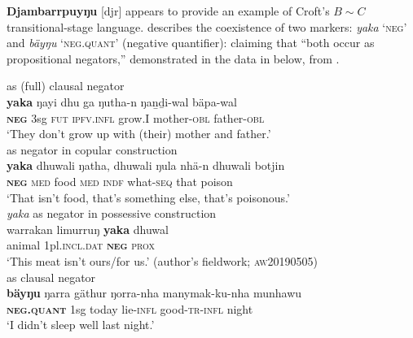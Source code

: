 \documentclass[output=paper,draft,draftmode,colorlinks,citecolor=brown]{langscibook}
\begin{document}
\textbf{Djambarrpuyŋu} [djr] appears to provide an example of Croft's $B\sim C$ transitional-stage language. \citet[356]{Wilkinson1991} describes the coexistence of two markers: \textit{yaka} `\textsc{neg}' and \textit{bäyŋu} `\textsc{neg.quant}' (negative quantifier): claiming that ``both occur as propositional negators,'' demonstrated in the data in  below, from \citet{Wilkinson1991}.

\begin{exe}\ex\label{ex:austr-djamb-negmarkers}
    \begin{xlist}
 as (full) clausal negator\\
\gll \textbf{yaka} ŋayi dhu ga ŋutha-n ŋaṉḏi-wal bäpa-wal\\
\textsc{\textbf{neg}} 3sg \textsc{fut} \textsc{ipfv.infl} grow.I mother\textsc{-obl} father\textsc{-obl}\\
\glt  `They don't grow up with (their) mother and father.'\\
%
 as negator in copular construction\\
\gll \textbf{yaka} dhuwali ŋatha, dhuwali ŋula nhä-n dhuwali botjin\\
\textsc{\textbf{neg}} \textsc{med} food \textsc{med} \textsc{indf} what-\textsc{seq} that poison\\
\glt `That isn't food, that's something else, that's poisonous.'\\
        \ex\label{ex:austr-djamb-negmarkers-meat} 
        \emph{yaka} as negator in possessive construction\\
\gll warrakan limurruŋ \textbf{yaka} dhuwal\\
animal 1pl.\textsc{incl.dat} \textbf{\textsc{neg}} \textsc{prox}\\
\glt `This meat isn't ours\slash for us.'  {(author's fieldwork;
        \textsc{aw20190505})}\\%
%
 as clausal negator\\
\gll \textbf{bäyŋu} ŋarra gäthur ŋorra-nha manymak-ku-nha munhawu\\
\textsc{\textbf{neg.quant}} 1sg today lie\textsc{-infl} good-\textsc{tr-infl} night\\
\glt  `I didn't sleep well last night.'\citep[357]{Wilkinson1991}\\
    \end{xlist}\end{exe}
\end{document}
